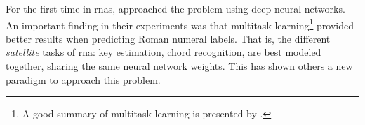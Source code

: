 

For the first time in \glspl{rna},
\textcite{chen2018functional} approached the problem using
deep neural networks. An important finding in their
experiments was that multitask learning\footnote{A good
summary of multitask learning is presented by
\textcite{ruder2017overview}.} provided better results when
predicting Roman numeral labels. That is, the different
\emph{satellite} tasks of \gls{rna}: key
estimation, chord recognition, are best modeled together,
sharing the same neural network weights. This has shown
others a new paradigm to approach this problem.
